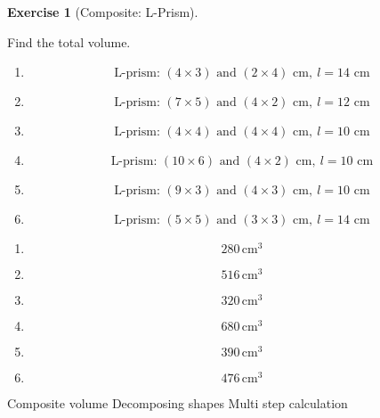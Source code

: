 \documentclass[
  letterpaper,
  DIV=11,
  numbers=noendperiod]{scrreprt}
\theoremstyle{definition}
\newtheorem{exercise}{Exercise}[chapter]
\theoremstyle{remark}
\begin{document}
\begin{exercise}[Composite:
L-Prism]\protect\hypertarget{exr-comp-2}{}\label{exr-comp-2}

Find the total volume.

\begin{enumerate}
\def\labelenumi{\alph{enumi})}
\item
  \[\text{L-prism: }(4\times3)\text{ and }(2\times4)\text{ cm},\ l=14\text{ cm}\]
\item
  \[\text{L-prism: }(7\times5)\text{ and }(4\times2)\text{ cm},\ l=12\text{ cm}\]
\item
  \[\text{L-prism: }(4\times4)\text{ and }(4\times4)\text{ cm},\ l=10\text{ cm}\]
\item
  \[\text{L-prism: }(10\times6)\text{ and }(4\times2)\text{ cm},\ l=10\text{ cm}\]
\item
  \[\text{L-prism: }(9\times3)\text{ and }(4\times3)\text{ cm},\ l=10\text{ cm}\]
\item
  \[\text{L-prism: }(5\times5)\text{ and }(3\times3)\text{ cm},\ l=14\text{ cm}\]
\end{enumerate}

\begin{tcolorbox}[enhanced jigsaw, opacitybacktitle=0.6, coltitle=black, arc=.35mm, colframe=quarto-callout-tip-color-frame, colback=white, bottomrule=.15mm, left=2mm, colbacktitle=quarto-callout-tip-color!10!white, titlerule=0mm, opacityback=0, title=\textcolor{quarto-callout-tip-color}{\faLightbulb}\hspace{0.5em}{🔍 View Solution}, leftrule=.75mm, breakable, rightrule=.15mm, bottomtitle=1mm, toptitle=1mm, toprule=.15mm]

\begin{enumerate}
\def\labelenumi{\alph{enumi})}
\item
  \[280\,\text{cm}^{3}\]
\item
  \[516\,\text{cm}^{3}\]
\item
  \[320\,\text{cm}^{3}\]
\item
  \[680\,\text{cm}^{3}\]
\item
  \[390\,\text{cm}^{3}\]
\item
  \[476\,\text{cm}^{3}\]
\end{enumerate}

\end{tcolorbox}

{Composite volume} {Decomposing shapes} {Multi step calculation}

\end{exercise}
\end{document}

